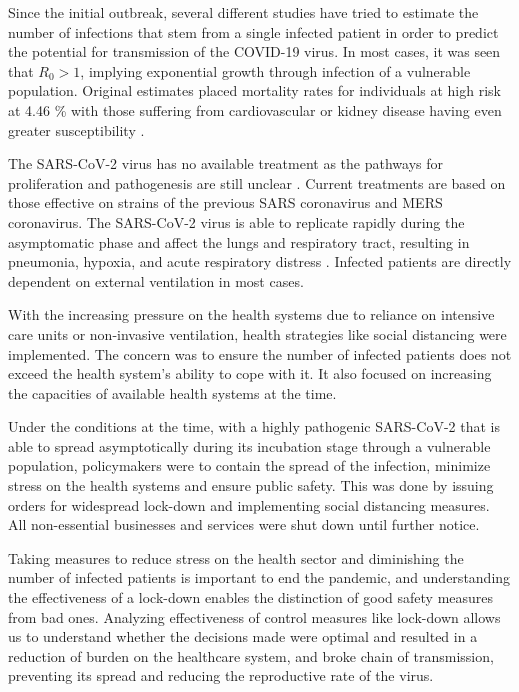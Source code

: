 \documentclass[preprint,authoryear,12pt]{elsarticle}
\begin{document}
	Since the initial outbreak, several different studies have tried to estimate the number of infections \cite{GN2020} that stem from a single infected patient in order to predict the potential for transmission of the COVID-19 virus. In most cases, it was seen that $R_0 > 1$, implying exponential growth through infection of a vulnerable population. Original estimates placed mortality rates for individuals at high risk at  4.46 \% with those suffering from cardiovascular or kidney disease having even greater susceptibility \cite{BPH2020}. 
	
	The SARS-CoV-2 virus has no available treatment as the pathways for proliferation and pathogenesis are still unclear \cite{RIS2020}.  Current treatments are based on those effective on strains of the previous SARS coronavirus and MERS coronavirus. The SARS-CoV-2  virus is able to replicate rapidly during the asymptomatic phase and affect the lungs and respiratory tract, resulting in pneumonia, hypoxia, and acute respiratory distress \cite{PSL2020}. Infected patients are directly dependent on external ventilation in most cases. 
	
	With the increasing pressure on the health systems due to reliance on intensive care units or non-invasive ventilation, health strategies like social distancing were implemented. The concern was to ensure the number of infected patients does not exceed the health system’s ability to cope with it. It also focused on increasing the capacities of available health systems at the time.
	
	Under the conditions at the time, with a highly pathogenic SARS-CoV-2 that is able to spread asymptotically during its incubation stage through a vulnerable population, policymakers were to contain the spread of the infection, minimize stress on the health systems and ensure public safety. This was done by issuing orders for widespread lock-down and implementing social distancing measures. All non-essential businesses and services were shut down until further notice. 
	
	Taking measures to reduce stress on the health sector and diminishing the number of infected patients is important to end the pandemic, and understanding the effectiveness of a lock-down enables the distinction of good safety measures from bad ones. Analyzing effectiveness of control measures like lock-down allows us to understand whether the decisions made were optimal and resulted in a reduction of burden on the healthcare system, and broke chain of transmission, preventing its spread and reducing the reproductive rate of the virus.
	
\end{document}
